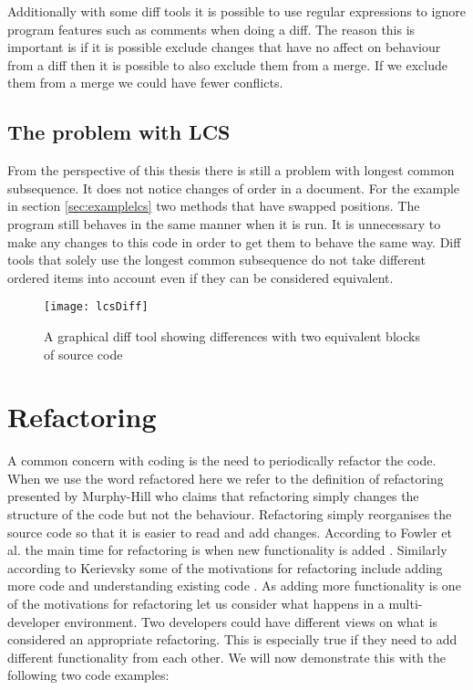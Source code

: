 Additionally with some diff tools it is possible to use regular expressions to ignore program features such as comments when doing a diff.  The reason this is important is if it is possible exclude changes that have no affect on behaviour from a diff then it is possible to also exclude them from a merge.  If we exclude them from a merge we could have fewer conflicts.


\subsection{The problem with LCS}
From the perspective of this thesis there is still a problem with longest common subsequence. 
It does not notice changes of order in a document.  
For the example in section \ref{sec:examplelcs} two methods that have swapped positions.
The program still behaves in the same manner when it is run.
It is unnecessary to make any changes to this code in order to get them to behave the same way.
Diff tools that solely use the longest common subsequence do not take different ordered items into account even if they can be considered equivalent.

\begin{figure}[h]
\begin{center}
\texttt{[image: lcsDiff]}
\end{center}
 \caption{A graphical diff tool showing differences with two equivalent blocks of source code}
\end{figure}


 

\section{Refactoring}
A common concern with coding is the need to periodically refactor the code. 
When we use the word refactored here we refer to the definition of refactoring presented by Murphy-Hill \cite{Murphy-Hill2008} who claims that refactoring simply changes the structure of the code but not the behaviour.
Refactoring simply reorganises the source code so that it is easier to read and add changes. 
According to Fowler et al. the main time for refactoring is when new functionality is added \cite{Fowler1999}. 
Similarly according to Kerievsky some of the motivations for refactoring include adding more code and understanding existing code \cite{Kerievsky2004}.
As adding more functionality is one of the motivations for refactoring let us consider what happens in a multi-developer environment. 
Two developers could have different views on what is considered an appropriate refactoring. 
This is especially true if they need to add different functionality from each other. 
We will now demonstrate this with the following two code examples:

